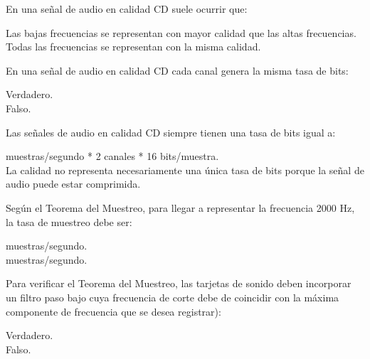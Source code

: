 \documentclass[legalpaper, 12pt, addpoints]{exam}
\begin{document}
\begin{questions}
\question En una señal de audio en calidad CD suele ocurrir que:

\begin{oneparchoices}
  \choice Las bajas frecuencias se representan con mayor calidad que las altas frecuencias.\\
  \choice Todas las frecuencias se representan con la misma calidad.
\end{oneparchoices}
  
\vspace{0.10in}

\question En una señal de audio en calidad CD cada canal genera la misma tasa de bits:

\begin{oneparchoices}
  \choice Verdadero.\\
  \choice Falso.
\end{oneparchoices}
  
\vspace{0.10in}

\question Las señales de audio en calidad CD siempre tienen una tasa de bits igual a:

\begin{oneparchoices}
   muestras/segundo * 2 canales * 16 bits/muestra.\\
  \choice La calidad no representa necesariamente una única tasa de
  bits porque la señal de audio puede estar comprimida.
\end{oneparchoices}
  
\vspace{0.10in}

\question Según el Teorema del Muestreo, para llegar a representar la
frecuencia 2000 Hz, la tasa de muestreo debe ser:

\begin{oneparchoices}
   muestras/segundo.\\
   muestras/segundo.
\end{oneparchoices}
  
\vspace{0.10in}

\question Para verificar el Teorema del Muestreo, las tarjetas de
sonido deben incorporar un filtro paso bajo cuya frecuencia de corte
debe de coincidir con la máxima componente de frecuencia que se desea
registrar):

\begin{oneparchoices}
  \choice Verdadero.\\
  \choice Falso.
\end{oneparchoices}
  

\end{questions}
\end{document}

